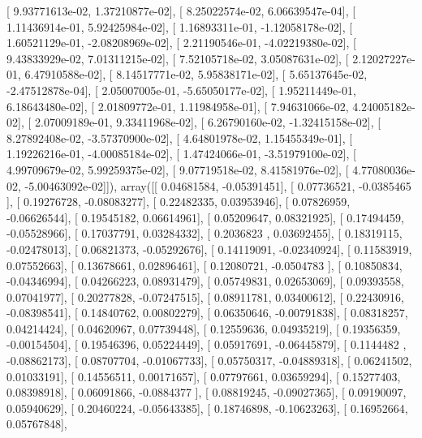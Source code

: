 \documentclass{article}
\begin{document}
       [  9.93771613e-02,   1.37210877e-02],
       [  8.25022574e-02,   6.06639547e-04],
       [  1.11436914e-01,   5.92425984e-02],
       [  1.16893311e-01,  -1.12058178e-02],
       [  1.60521129e-01,  -2.08208969e-02],
       [  2.21190546e-01,  -4.02219380e-02],
       [  9.43833929e-02,   7.01311215e-02],
       [  7.52105718e-02,   3.05087631e-02],
       [  2.12027227e-01,   6.47910588e-02],
       [  8.14517771e-02,   5.95838171e-02],
       [  5.65137645e-02,  -2.47512878e-04],
       [  2.05007005e-01,  -5.65050177e-02],
       [  1.95211449e-01,   6.18643480e-02],
       [  2.01809772e-01,   1.11984958e-01],
       [  7.94631066e-02,   4.24005182e-02],
       [  2.07009189e-01,   9.33411968e-02],
       [  6.26790160e-02,  -1.32415158e-02],
       [  8.27892408e-02,  -3.57370900e-02],
       [  4.64801978e-02,   1.15455349e-01],
       [  1.19226216e-01,  -4.00085184e-02],
       [  1.47424066e-01,  -3.51979100e-02],
       [  4.99709679e-02,   5.99259375e-02],
       [  9.07719518e-02,   8.41581976e-02],
       [  4.77080036e-02,  -5.00463092e-02]]), array([[ 0.04681584, -0.05391451],
       [ 0.07736521, -0.0385465 ],
       [ 0.19276728, -0.08083277],
       [ 0.22482335,  0.03953946],
       [ 0.07826959, -0.06626544],
       [ 0.19545182,  0.06614961],
       [ 0.05209647,  0.08321925],
       [ 0.17494459, -0.05528966],
       [ 0.17037791,  0.03284332],
       [ 0.2036823 ,  0.03692455],
       [ 0.18319115, -0.02478013],
       [ 0.06821373, -0.05292676],
       [ 0.14119091, -0.02340924],
       [ 0.11583919,  0.07552663],
       [ 0.13678661,  0.02896461],
       [ 0.12080721, -0.0504783 ],
       [ 0.10850834, -0.04346994],
       [ 0.04266223,  0.08931479],
       [ 0.05749831,  0.02653069],
       [ 0.09393558,  0.07041977],
       [ 0.20277828, -0.07247515],
       [ 0.08911781,  0.03400612],
       [ 0.22430916, -0.08398541],
       [ 0.14840762,  0.00802279],
       [ 0.06350646, -0.00791838],
       [ 0.08318257,  0.04214424],
       [ 0.04620967,  0.07739448],
       [ 0.12559636,  0.04935219],
       [ 0.19356359, -0.00154504],
       [ 0.19546396,  0.05224449],
       [ 0.05917691, -0.06445879],
       [ 0.1144482 , -0.08862173],
       [ 0.08707704, -0.01067733],
       [ 0.05750317, -0.04889318],
       [ 0.06241502,  0.01033191],
       [ 0.14556511,  0.00171657],
       [ 0.07797661,  0.03659294],
       [ 0.15277403,  0.08398918],
       [ 0.06091866, -0.0884377 ],
       [ 0.08819245, -0.09027365],
       [ 0.09190097,  0.05940629],
       [ 0.20460224, -0.05643385],
       [ 0.18746898, -0.10623263],
       [ 0.16952664,  0.05767848],
\end{document}
